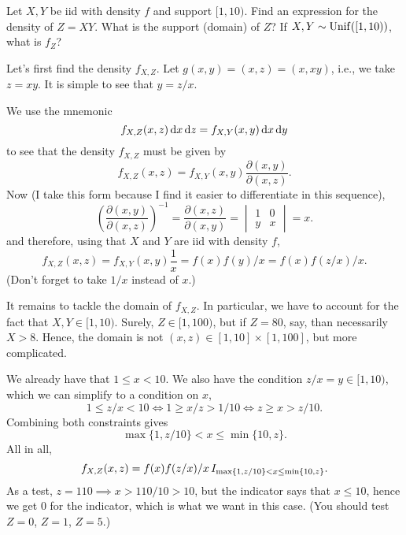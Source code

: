 \begin{exercise}
Let $X,Y$ be iid with density $f$ and support $[1,10)$. Find an expression for the density of $Z=X Y$. What is the support (domain) of $Z$? If $X,Y\sim\mathrm{Unif}([1,10))$, what is $f_{Z}$?
\begin{solution}
Let's first find the density $f_{X,Z}$.
Let $g(x,y) = (x, z) = (x, x y)$, i.e., we take $z=x y$. It is simple to see that $y=z/x$.

We use the mnemonic
\begin{equation}
\label{eq:20}
f_{X,Z}(x,z) \,\textrm{d}x \,\textrm{d}z =
f_{X,Y}(x,y) \,\textrm{d}x \,\textrm{d}y
\end{equation}
to see that the density $f_{X,Z}$ must be given by
\begin{equation}
f_{X,Z}(x,z)  = f_{X,Y}(x,y) \frac{\partial(x,y)}{\partial(x, z)}.
\end{equation}
Now (I take this form because I find it easier to differentiate in this sequence),
\begin{equation}
\label{eq:19}
\left(\frac{\partial(x,y)}{\partial(x,z)}\right)^{-1} =
\frac{\partial(x,z)}{\partial(x,y)} =
\begin{vmatrix}
  1 & 0 \\
y & x
\end{vmatrix} = x.
\end{equation}
and therefore, using that $X$ and $Y$ are iid with density $f$,
\begin{equation}
f_{X,Z}(x,z)  = f_{X,Y}(x,y) \frac{1}{x} = f(x)f(y)/x = f(x)f(z/x)/ x.
\end{equation}
(Don't forget to take $1/x$ instead of $x$.)

It remains to tackle the domain of $f_{X,Z}$.
In particular, we have to account for the fact that $X, Y\in [1,10)$.
Surely, $Z\in [1, 100)$, but if $Z=80$, say, than necessarily $X>8$.
Hence, the domain is not $(x,z) \in [1,10]\times [1, 100]$, but more complicated.

We already have that $1\leq x < 10$. We also have the condition $z/x = y\in [1, 10)$, which we can simplify to a condition on $x$,
\begin{equation}
\label{eq:22}
1\leq z/x < 10 \iff 1 \geq x/z > 1/10 \iff z \geq x > z/10.
\end{equation}
Combining both constraints gives
\begin{equation}
\max\{1, z/10\} < x \leq \min\{10, z\}.
\end{equation}
All in all,
\begin{equation}
f_{X,Z}(x,z)  = f(x)f(z/x)/ x \,I_{\max\{1, z/10\}< x \leq \min\{10, z\}}.
\end{equation}
As a test, $z=110 \implies x > 110/10 > 10$, but the indicator says that $x\leq 10$, hence we get 0 for the indicator, which is what we want in this case. (You should test $Z=0$, $Z=1$, $Z=5$.)


\end{solution}
\end{exercise}
